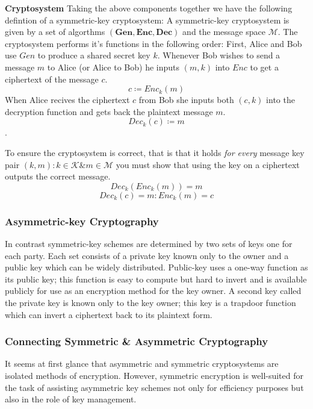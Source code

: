 \textbf{Cryptosystem}
\medskip
Taking the above components together we have the following defintion of a symmetric-key \gls{cryptosystem}:
\newline
A symmetric-key cryptosystem is given by a set of algorthms $\mathbf{(Gen, Enc, Dec)}$ and the message space $\mathcal{M}$.
\newline
The cryptosystem performs it's functions in the following order:
\newline
First, Alice and Bob use $Gen$ to produce a shared secret key $k$.
\newline
Whenever Bob wishes to send a message $m$ to Alice (or Alice to Bob) he inputs $(m,k)$ into $Enc$ to get a ciphertext of the message $c$.
$$c \coloneqq Enc_{k}(m)$$
\newline
When Alice recives the ciphertext $c$ from Bob she inputs both $(c,k)$ into the decryption function and gets back the plaintext message $m$.
$$Dec_{k}(c) \coloneqq m$$.
\medskip

To ensure the cryptosystem is correct, that is that it holds \textit{for every} message key pair $(k,m) : k \in \mathcal{K} \& m \in \mathcal{M}$ you must show that using the key on a ciphertext outputs the correct message. 
$$Dec_{k}(Enc_{k}(m)) = m$$
\newline
$$Dec_{k}(c) = m : Enc_{k}(m) = c$$



\subsubsection{Asymmetric-key Cryptography}
In contrast symmetric-key schemes are determined by two sets of keys one for each party. Each set consists of a \gls{private key} known only to the owner and a \gls{public key} which can be widely distributed.
Public-key uses a \gls{one-way function} as its public key; this function is easy to compute but hard to invert and is available publicly for use as an encryption method for the key owner. A second key called the private key is known only to the key owner; this key is a \gls{trapdoor function} which can invert a ciphertext back to its plaintext form.


 
\subsubsection{Connecting Symmetric \& Asymmetric Cryptography}
It seems at first glance that asymmetric and symmetric cryptosystems are isolated methods of encryption. However, symmetric encryption is well-suited for the task of assisting asymmetric key schemes not only for efficiency purposes but also in the role of key management. 
